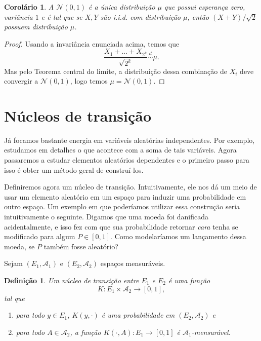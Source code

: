 \documentclass[reqno]{article}
\newcommand*\1{\mathds{1}}
\newtheorem{corollary}[theorem]{Corolário}
\newtheorem{definition}[theorem]{Definição}
\def \distr {\overset{d}{\sim}}
\begin{document}
\begin{corollary}
  A $\mathcal{N}(0,1)$ é a única distribuição $\mu$ que possui esperança zero, variância $1$ e é tal que se $X, Y$ são i.i.d. com distribuição $\mu$, então $(X + Y)/\sqrt{2}$ possuem distribuição $\mu$.
\end{corollary}

\begin{proof}
  Usando a invariância enunciada acima, temos que
  \begin{equation}
    \frac{X_1 + \dots + X_{2^k}}{\sqrt{2^k}} \distr \mu.
  \end{equation}
  Mas pelo Teorema central do limite, a distribuição dessa combinação de $X_i$ deve convergir a $\mathcal{N}(0,1)$, logo temos $\mu = \mathcal{N}(0,1)$.
\end{proof}

\newpage

\section{Núcleos de transição}

Já focamos bastante energia em variáveis aleatórias independentes.
Por exemplo, estudamos em detalhes o que acontece com a soma de tais variáveis.
Agora passaremos a estudar elementos aleatórios dependentes e o primeiro passo para isso é obter um método geral de construí-los.

Definiremos agora um núcleo de transição.
Intuitivamente, ele nos dá um meio de usar um elemento aleatório em um espaço para induzir uma probabilidade em outro espaço.
Um exemplo em que poderíamos utilizar essa construção seria intuitivamente o seguinte.
Digamos que uma moeda foi danificada acidentalmente, e isso fez com que sua probabilidade retornar \emph{cara} tenha se modificado para algum $P \in [0,1]$.
Como modelaríamos um lançamento dessa moeda, se $P$ também fosse aleatório?

Sejam $(E_1, \mathcal{A}_1)$ e $(E_2, \mathcal{A}_2)$ espaços mensuráveis.

\begin{definition}
  Um núcleo de transição entre $E_1$ e $E_2$ é uma função
  \begin{equation}
    K: E_1 \times \mathcal{A}_2 \to [0,1],
  \end{equation}
  tal que
  \begin{enumerate}[\quad a)]
  \item para todo $y \in E_1$, $K(y,\cdot)$ é uma probabilidade em $(E_2, \mathcal{A}_2)$ e
  \item para todo $A \in \mathcal{A}_2$, a função $K(\cdot, A): E_1 \to [0,1]$ é $\mathcal{A}_1$-mensurável.
  \end{enumerate}
\end{definition}
\end{document}
